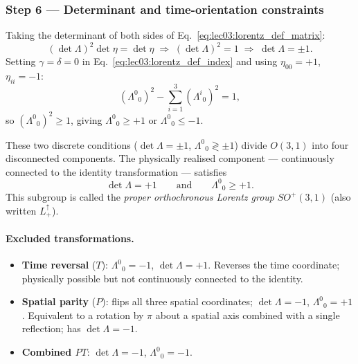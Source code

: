 \subsubsection*{Step 6 — Determinant and time-orientation constraints}

Taking the determinant of both sides of
Eq.~\eqref{eq:lec03:lorentz_def_matrix}:
\begin{equation}
  (\det\Lambda)^2\det\eta = \det\eta
  \;\Rightarrow\;
  (\det\Lambda)^2 = 1
  \;\Rightarrow\;
  \det\Lambda = \pm 1.
  \label{eq:lec03:det}
\end{equation}
Setting $\gamma=\delta=0$ in Eq.~\eqref{eq:lec03:lorentz_def_index}
and using $\eta_{00}=+1$, $\eta_{ii}=-1$:
\begin{equation}
  (\Lambda^0{}_0)^2 - \sum_{i=1}^{3}(\Lambda^i{}_0)^2 = 1,
  \label{eq:lec03:00_condition}
\end{equation}
so $(\Lambda^0{}_0)^2 \ge 1$, giving $\Lambda^0{}_0 \ge +1$ or
$\Lambda^0{}_0 \le -1$.

These two discrete conditions ($\det\Lambda=\pm 1$,
$\Lambda^0{}_0 \gtrless\pm 1$) divide $O(3,1)$ into four disconnected
components.  The physically realised component — continuously connected
to the identity transformation — satisfies
\begin{equation}
  \det\Lambda = +1 \qquad\text{and}\qquad \Lambda^0{}_0 \ge +1.
  \label{eq:lec03:proper_orthochronous}
\end{equation}
This subgroup is called the \emph{proper orthochronous Lorentz group}
$SO^+(3,1)$ (also written $L^\uparrow_+$).

\paragraph{Excluded transformations.}
\begin{itemize}
  \item \textbf{Time reversal} ($T$): $\Lambda^0{}_0 = -1$,
    $\det\Lambda=+1$.  Reverses the time coordinate; physically
    possible but not continuously connected to the identity.
  \item \textbf{Spatial parity} ($P$): flips all three spatial
    coordinates; $\det\Lambda = -1$, $\Lambda^0{}_0 = +1$.  Equivalent
    to a rotation by $\pi$ about a spatial axis combined with a single
    reflection; has $\det\Lambda=-1$.
  \item \textbf{Combined $PT$}: $\det\Lambda = -1$,
    $\Lambda^0{}_0 = -1$.
\end{itemize}

